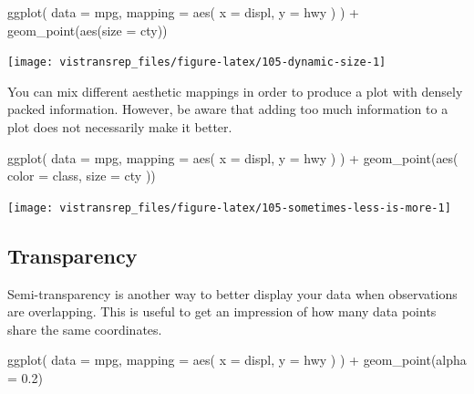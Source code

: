 \documentclass[]{book}
\newenvironment{Shaded}{}{}
\newcommand{\DataTypeTok}[1]{#1}
\newcommand{\FloatTok}[1]{#1}
\newcommand{\KeywordTok}[1]{\textcolor[rgb]{0.00,0.00,1.00}{#1}}
\newcommand{\NormalTok}[1]{#1}
\newcommand{\OperatorTok}[1]{#1}
\newcommand{\StringTok}[1]{\textcolor[rgb]{0.00,0.50,0.50}{#1}}
\begin{document}
\begin{Shaded}
\begin{Highlighting}[]
\KeywordTok{ggplot}\NormalTok{(}
  \DataTypeTok{data =}\NormalTok{ mpg,}
  \DataTypeTok{mapping =} \KeywordTok{aes}\NormalTok{(}
    \DataTypeTok{x =}\NormalTok{ displ,}
    \DataTypeTok{y =}\NormalTok{ hwy}
\NormalTok{  )}
\NormalTok{) }\OperatorTok{+}
\StringTok{  }\KeywordTok{geom_point}\NormalTok{(}\KeywordTok{aes}\NormalTok{(}\DataTypeTok{size =}\NormalTok{ cty))}
\end{Highlighting}
\end{Shaded}

\begin{flushright}\texttt{[image: vistransrep\_files/figure-latex/105-dynamic-size-1]} \end{flushright}

You can mix different aesthetic mappings in order to produce a plot with densely packed information.
However, be aware that adding too much information to a plot does not necessarily make it better.

\begin{Shaded}
\begin{Highlighting}[]
\KeywordTok{ggplot}\NormalTok{(}
  \DataTypeTok{data =}\NormalTok{ mpg,}
  \DataTypeTok{mapping =} \KeywordTok{aes}\NormalTok{(}
    \DataTypeTok{x =}\NormalTok{ displ,}
    \DataTypeTok{y =}\NormalTok{ hwy}
\NormalTok{  )}
\NormalTok{) }\OperatorTok{+}
\StringTok{  }\KeywordTok{geom_point}\NormalTok{(}\KeywordTok{aes}\NormalTok{(}
    \DataTypeTok{color =}\NormalTok{ class,}
    \DataTypeTok{size =}\NormalTok{ cty}
\NormalTok{  ))}
\end{Highlighting}
\end{Shaded}

\begin{flushright}\texttt{[image: vistransrep\_files/figure-latex/105-sometimes-less-is-more-1]} \end{flushright}

\hypertarget{transparency}{%
\subsection{Transparency}\label{transparency}}

Semi-transparency is another way to better display your data when observations are overlapping.
This is useful to get an impression of how many data points share the same coordinates.

\begin{Shaded}
\begin{Highlighting}[]
\KeywordTok{ggplot}\NormalTok{(}
  \DataTypeTok{data =}\NormalTok{ mpg,}
  \DataTypeTok{mapping =} \KeywordTok{aes}\NormalTok{(}
    \DataTypeTok{x =}\NormalTok{ displ,}
    \DataTypeTok{y =}\NormalTok{ hwy}
\NormalTok{  )}
\NormalTok{) }\OperatorTok{+}
\StringTok{  }\KeywordTok{geom_point}\NormalTok{(}\DataTypeTok{alpha =} \FloatTok{0.2}\NormalTok{)}
\end{Highlighting}
\end{Shaded}
\end{document}

